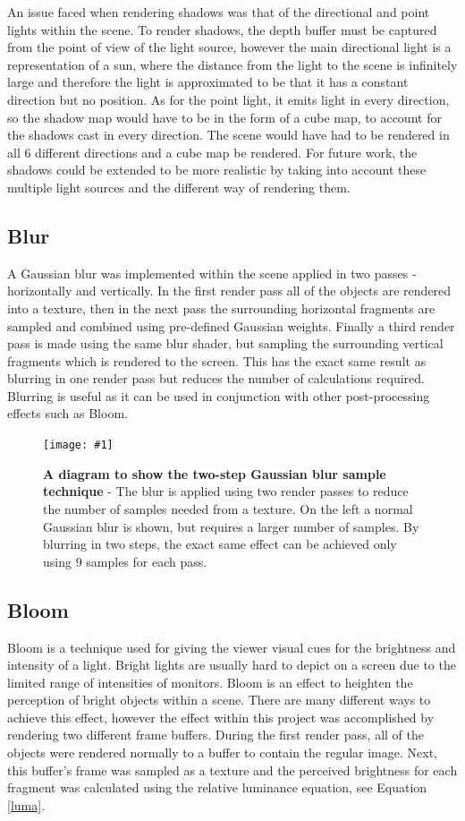 \documentclass[conference]{acmsiggraph}
\newcommand{\figuremacroW}[4]{
\begin{figure}[h] %
	\centering
	\texttt{[image: \#1]}
	\caption[#2]{\textbf{#2} - #3}
	\label{fig:#1}
\end{figure}
}
\begin{document}
An issue faced when rendering shadows was that of the directional and point lights within the scene. To render shadows, the depth buffer must be captured from the point of view of the light source, however the main directional light is a representation of a sun, where the distance from the light to the scene is infinitely large and therefore the light is approximated to be that it has a constant direction but no position. As for the point light, it emits light in every direction, so the shadow map would have to be in the form of a cube map, to account for the shadows cast in every direction. The scene would have had to be rendered in all 6 different directions and a cube map be rendered. For future work, the shadows could be extended to be more realistic by taking into account these multiple light sources and the different way of rendering them.
	
\subsection{Blur}

A Gaussian blur was implemented within the scene applied in two passes - horizontally and vertically. In the first render pass all of the objects are rendered into a texture, then in the next pass the surrounding horizontal fragments are sampled and combined using pre-defined Gaussian weights. \cite{blurExample} Finally a third render pass is made using the same blur shader, but sampling the surrounding vertical fragments which is rendered to the screen. This has the exact same result as blurring in one render pass but reduces the number of calculations required. Blurring is useful as it can be used in conjunction with other post-processing effects such as Bloom.

\figuremacroW
{bloom_gaussian_two_pass}
{A diagram to show the two-step Gaussian blur sample technique}
{The blur is applied using two render passes to reduce the number of samples needed from a texture. On the left a normal Gaussian blur is shown, but requires a larger number of samples. By blurring in two steps, the exact same effect can be achieved only using 9 samples for each pass. \cite{blurDiagram}}
{1.0}
	
\subsection{Bloom}

Bloom is a technique used for giving the viewer visual cues for the brightness and intensity of a light. Bright lights are usually hard to depict on a screen due to the limited range of intensities of monitors. Bloom is an effect to heighten the perception of bright objects within a scene. There are many different ways to achieve this effect, however the effect within this project was accomplished by rendering two different frame buffers. During the first render pass, all of the objects were rendered normally to a buffer to contain the regular image. Next, this buffer's frame was sampled as a texture and the perceived brightness for each fragment was calculated using the relative luminance equation, see Equation \ref{luma}.
\end{document}
